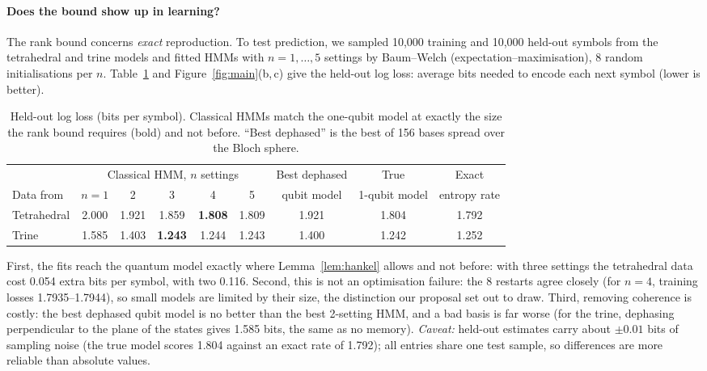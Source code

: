 \documentclass[11pt]{article}
\begin{document}
\paragraph{Does the bound show up in learning?} The rank bound concerns \emph{exact} reproduction. To test prediction, we sampled 10{,}000 training and 10{,}000 held-out symbols from the tetrahedral and trine models and fitted HMMs with $n=1,\dots,5$ settings by Baum--Welch (expectation--maximisation), 8 random initialisations per $n$. Table~\ref{tab:fits} and Figure~\ref{fig:main}(b,\,c) give the held-out log loss: average bits needed to encode each next symbol (lower is better).

\begin{table}[h]
\centering\footnotesize
\begin{tabular}{lccccc|cc|c}
\toprule
 & \multicolumn{5}{c|}{Classical HMM, $n$ settings} & Best dephased & True & Exact \\
Data from & $n=1$ & 2 & 3 & 4 & 5 & qubit model & 1-qubit model & entropy rate \\
\midrule
Tetrahedral & 2.000 & 1.921 & 1.859 & \textbf{1.808} & 1.809 & 1.921 & 1.804 & 1.792 \\
Trine & 1.585 & 1.403 & \textbf{1.243} & 1.244 & 1.243 & 1.400 & 1.242 & 1.252 \\
\bottomrule
\end{tabular}
\caption{Held-out log loss (bits per symbol). Classical HMMs match the one-qubit model at exactly the size the rank bound requires (bold) and not before. ``Best dephased'' is the best of 156 bases spread over the Bloch sphere.}
\label{tab:fits}
\end{table}

First, the fits reach the quantum model exactly where Lemma~\ref{lem:hankel} allows and not before: with three settings the tetrahedral data cost 0.054 extra bits per symbol, with two 0.116. Second, this is not an optimisation failure: the 8 restarts agree closely (for $n=4$, training losses 1.7935--1.7944), so small models are limited by their size, the distinction our proposal set out to draw. Third, removing coherence is costly: the best dephased qubit model is no better than the best 2-setting HMM, and a bad basis is far worse (for the trine, dephasing perpendicular to the plane of the states gives 1.585 bits, the same as no memory). \emph{Caveat:} held-out estimates carry about $\pm0.01$ bits of sampling noise (the true model scores 1.804 against an exact rate of 1.792); all entries share one test sample, so differences are more reliable than absolute values.
\end{document}
